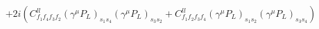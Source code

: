 %
\begin{dmath*}
%
  +  2 i \left(C^{ll}_{f_1 f_4 f_3 f_2} (\gamma^{\mu} P_L)_{s_1 s_4} (\gamma^{\mu} P_L)_{s_3 s_2} + C^{ll}_{f_1 f_2 f_3 f_4} (\gamma^{\mu} P_L)_{s_1 s_2} (\gamma^{\mu} P_L)_{s_3 s_4}\right)
%
\end{dmath*}
%
